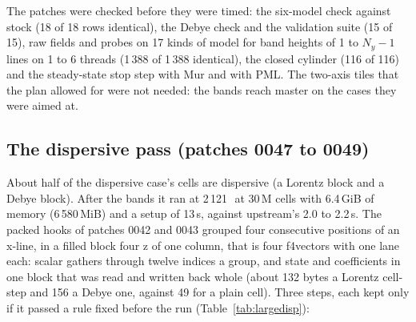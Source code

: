 The patches were checked before they were timed: the six-model check against stock (18 of 18 rows identical), the Debye
check and the validation suite (15 of 15), raw fields and probes on 17 kinds of model for band heights of 1 to $N_y-1$
lines on 1 to 6 threads (1\,388 of 1\,388 identical), the closed cylinder (116 of 116) and the steady-state stop step with
Mur and with PML. The two-axis tiles that the plan allowed for were not needed: the bands reach master on the cases they
were aimed at.

\subsection{The dispersive pass (patches 0047 to 0049)}
About half of the dispersive case's cells are dispersive (a Lorentz block and a Debye block). After the bands it ran at 2\,121\,\MC\ at 30\,M cells with 6.4\,GiB of memory (6\,580\,MiB) and a setup of 13\,s, against
upstream's 2.0 to 2.2\,s. The packed hooks of patches
0042 and 0043 grouped four consecutive positions of an x-line, in a filled block four z of one column, that is four f4vectors
with one lane each: scalar gathers through twelve indices a group, and state and coefficients in one block that was
read and written back whole (about 132 bytes a Lorentz cell-step and 156 a Debye one, against 49 for a plain cell).
Three steps, each kept only if it passed a rule fixed before the run (Table~\ref{tab:largedisp}):

